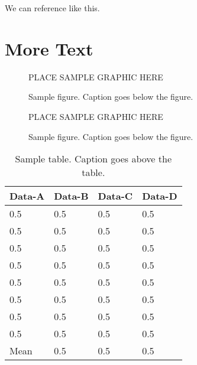 \documentclass[master]{thesis}
\begin{document}
We can reference  like this.

\chapter{More Text}
\label{chap:more}

\lipsum[1-10]

\begin{figure}[hp] %
    PLACE SAMPLE GRAPHIC HERE
    \caption{Sample figure.  Caption goes below the figure.}
    \label{fig:sample2}
\end{figure}
\begin{figure}[hp] %
    PLACE SAMPLE GRAPHIC HERE
    \caption{Sample figure.  Caption goes below the figure.}
    \label{fig:sample3}
\end{figure}


\begin{table*}[hp]
    \caption{Sample table.  Caption goes above the table.}
    \label{table:sample2}
    \begin{center}
        \begin{tabular}{@{}*{4}{l}} %
            \toprule
            Data-A  & Data-B    & Data-C    & Data-D \\
            \midrule
            0.5     & 0.5       & 0.5       & 0.5   \\
            0.5     & 0.5       & 0.5       & 0.5   \\
            0.5     & 0.5       & 0.5       & 0.5   \\
            0.5     & 0.5       & 0.5       & 0.5   \\
            0.5     & 0.5       & 0.5       & 0.5   \\
            0.5     & 0.5       & 0.5       & 0.5   \\
            0.5     & 0.5       & 0.5       & 0.5   \\
            0.5     & 0.5       & 0.5       & 0.5   \\
            \midrule
            Mean    & 0.5       & 0.5       & 0.5   \\
            \bottomrule
        \end{tabular}
    \end{center}
\end{table*}
\end{document}
